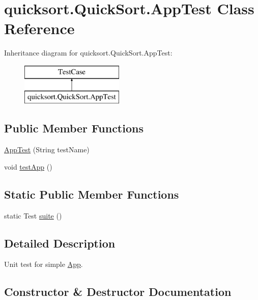 \hypertarget{classquicksort_1_1_quick_sort_1_1_app_test}{}\section{quicksort.\+Quick\+Sort.\+App\+Test Class Reference}
\label{classquicksort_1_1_quick_sort_1_1_app_test}
Inheritance diagram for quicksort.\+Quick\+Sort.\+App\+Test\+:\begin{figure}[H]
\begin{center}
\leavevmode
\includegraphics[height=2.000000cm]{classquicksort_1_1_quick_sort_1_1_app_test}
\end{center}
\end{figure}
\subsection*{Public Member Functions}
\begin{DoxyCompactItemize}
\item 
\hyperlink{classquicksort_1_1_quick_sort_1_1_app_test_ae8c997e6a46ee248a93439fdbcd483da}{App\+Test} (String test\+Name)
\item 
void \hyperlink{classquicksort_1_1_quick_sort_1_1_app_test_ae2281094b08e5122fd4426edaf856294}{test\+App} ()
\end{DoxyCompactItemize}
\subsection*{Static Public Member Functions}
\begin{DoxyCompactItemize}
\item 
static Test \hyperlink{classquicksort_1_1_quick_sort_1_1_app_test_a755a777fe26867089c5837bcd43e5c66}{suite} ()
\end{DoxyCompactItemize}


\subsection{Detailed Description}
Unit test for simple \hyperlink{classquicksort_1_1_quick_sort_1_1_app}{App}. 

\subsection{Constructor \& Destructor Documentation}
\hypertarget{classquicksort_1_1_quick_sort_1_1_app_test_ae8c997e6a46ee248a93439fdbcd483da}{}\label{classquicksort_1_1_quick_sort_1_1_app_test_ae8c997e6a46ee248a93439fdbcd483da} 
